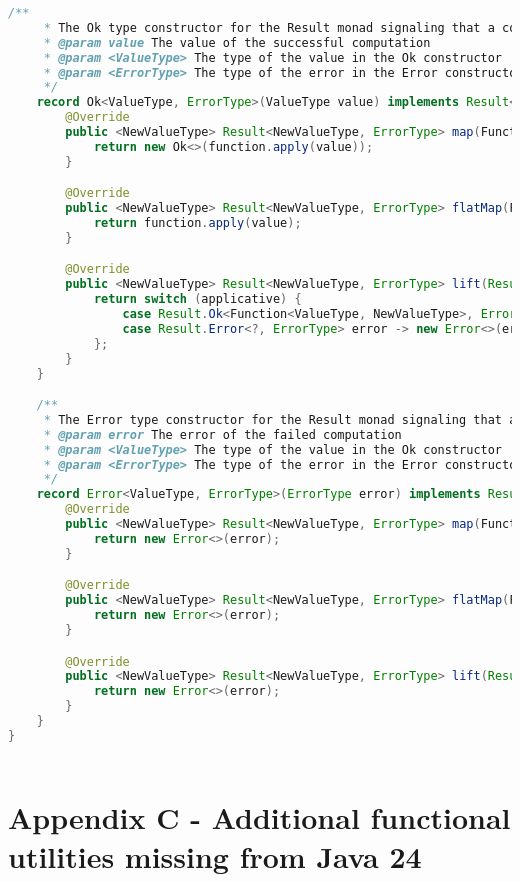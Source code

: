 \begin{lstlisting}[language=Java]
    /**
     * The Ok type constructor for the Result monad signaling that a computation succeeded
     * @param value The value of the successful computation
     * @param <ValueType> The type of the value in the Ok constructor
     * @param <ErrorType> The type of the error in the Error constructor
     */
    record Ok<ValueType, ErrorType>(ValueType value) implements Result<ValueType, ErrorType> {
        @Override
        public <NewValueType> Result<NewValueType, ErrorType> map(Function<ValueType, NewValueType> function) {
            return new Ok<>(function.apply(value));
        }

        @Override
        public <NewValueType> Result<NewValueType, ErrorType> flatMap(Function<ValueType, Result<NewValueType, ErrorType>> function) {
            return function.apply(value);
        }

        @Override
        public <NewValueType> Result<NewValueType, ErrorType> lift(Result<Function<ValueType, NewValueType>, ErrorType> applicative) {
            return switch (applicative) {
                case Result.Ok<Function<ValueType, NewValueType>, ErrorType> ok -> new Ok<>(ok.value.apply(value()));
                case Result.Error<?, ErrorType> error -> new Error<>(error.error());
            };
        }
    }

    /**
     * The Error type constructor for the Result monad signaling that a computation failed
     * @param error The error of the failed computation
     * @param <ValueType> The type of the value in the Ok constructor
     * @param <ErrorType> The type of the error in the Error constructor
     */
    record Error<ValueType, ErrorType>(ErrorType error) implements Result<ValueType, ErrorType> {
        @Override
        public <NewValueType> Result<NewValueType, ErrorType> map(Function<ValueType, NewValueType> function) {
            return new Error<>(error);
        }

        @Override
        public <NewValueType> Result<NewValueType, ErrorType> flatMap(Function<ValueType, Result<NewValueType, ErrorType>> function) {
            return new Error<>(error);
        }

        @Override
        public <NewValueType> Result<NewValueType, ErrorType> lift(Result<Function<ValueType, NewValueType>, ErrorType> applicative) {
            return new Error<>(error);
        }
    }
}
    
\end{lstlisting}

\chapter{Appendix C - Additional functional utilities missing from Java 24} \label{appendix:functionalutilities}

